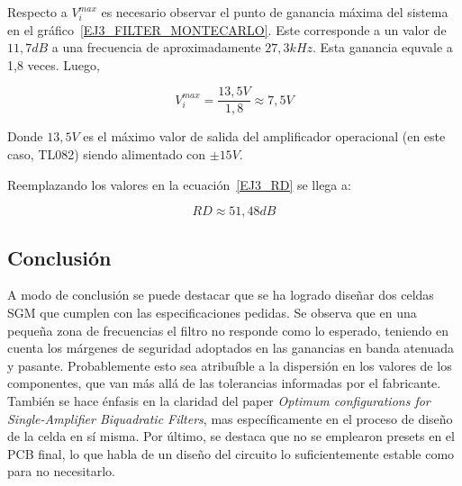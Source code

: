 Respecto a $V_i^{max}$ es necesario observar el punto de ganancia m\'axima del sistema en el gr\'afico~\ref{EJ3_FILTER_MONTECARLO}. Este corresponde a un valor de $11,7dB$ a una frecuencia de aproximadamente $27,3kHz$. Esta ganancia equvale a 1,8 veces. Luego,

\begin{equation}
V_i^{max} = \frac{13,5 V}{1,8} \approx 7,5 V
\end{equation}

Donde $13,5V$ es el m\'aximo valor de salida del amplificador operacional (en este caso, TL082) siendo alimentado con $\pm 15V$.


Reemplazando los valores en la ecuaci\'on~\ref{EJ3_RD} se llega a:

\begin{equation}
RD \approx 51,48dB
\end{equation}

\subsection{Conclusi\'on}

A modo de conclusi\'on se puede destacar que se ha logrado dise\~nar dos celdas SGM que cumplen con las especificaciones pedidas. Se observa que en una peque\~na zona de frecuencias el filtro no responde como lo esperado, teniendo en cuenta los m\'argenes de seguridad adoptados en las ganancias en banda atenuada y pasante. Probablemente esto sea atribu\'ible a la dispersi\'on en los  valores de los componentes, que van m\'as all\'a de las tolerancias informadas por el fabricante. Tambi\'en se hace \'enfasis en la claridad del paper \textit{Optimum configurations for Single-Amplifier Biquadratic Filters}, mas espec\'ificamente en el proceso de dise\~no de la celda en s\'i misma. Por \'ultimo, se destaca que no se emplearon presets en el PCB final, lo que habla de un dise\~no del circuito lo suficientemente estable como para no necesitarlo.
